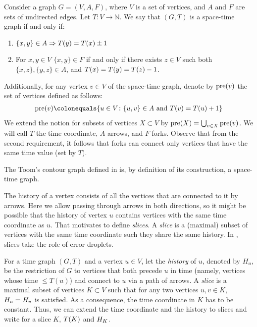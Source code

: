   \begin{definition}
    Consider a graph $G = (V, A, F)$, where $V$ is a set of vertices, and $A$ and $F$ are sets of undirected edges. 
    Let $ T \colon V \rightarrow \mathbb{N}$. We say that $(G,T)$ is a space-time graph if and only if:
\begin{enumerate}
  \item $\{x,y\} \in A \Rightarrow T(y) = T(x) \pm 1$  
  \item For $x,y \in V $  $\{x,y\} \in F $ if and only if there exists $z \in V $ such both $\{x,z\},\{y,z\} \in A$, and $T(x) = T(y) = T(z)-1$. 
\end{enumerate} 
Additionally, for any vertex $v \in V$ of the space-time graph, denote by $\text{pre}(v)$ the set of vertices defined as follows: 
    \begin{equation*}
      \begin{split}
\pre{v} \colonequals \{ u \in V \colon \{u,v\} \in A \text{ and } \Time{v} = \Time{u} + 1 \}
      \end{split}
    \end{equation*}
We extend the notion for subsets of vertices $X \subset V$ by $\text{pre}(X) = \bigcup_{v \in X} \text{pre}(v)$. We will call $T$ the time coordinate, $A$ arrows, and $F$ forks. Observe that from the second requirement, it follows that forks can connect only vertices that have the same time value (set by $T$).
  \end{definition}
  \begin{remark}
    The Toom's contour graph defined in  is, by definition of its construction, a space-time graph.
\end{remark}
The history of a vertex consists of all the vertices that are connected to it by arrows. Here we allow passing through arrows in both directions, so it might be possible that the history of vertex $u$ contains vertices with the same time coordinate as $u$. That motivates to define \textit{slices}. A \textit{slice} is a (maximal) subset of vertices with the same time coordinate such they share the same history. In \cite{Berman}, slices take the role of error droplets.
  \begin{definition}
    \label{def:slice}
For a time graph $(G,T)$ and a vertex $u \in V$, let the \textit{history} of $u$, denoted by $H_{u}$, be the restriction of $G$ to vertices that both precede $u$ in time (namely, vertices whose time $\le T(u)$) and connect to $u$ via a path of arrows. A \textit{slice} is a maximal subset of vertices $K \subset V$ such that for any two vertices $u,v \in K$, $H_{u} = H_{v}$ is satisfied. As a consequence, the time coordinate in $K$ has to be constant. Thus, we can extend the time coordinate and the history to slices and write for a slice $K$, $T(K)$ and $H_{K}$.
  \end{definition}
